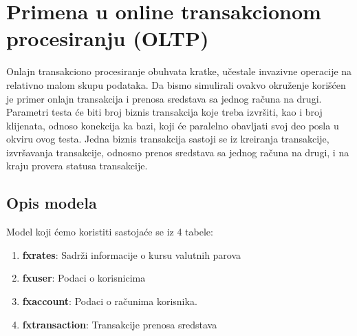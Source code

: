 \documentclass[12pt,oneside]{memoir}
\begin{document}
\pagebreak

\section{Primena u online transakcionom procesiranju (OLTP)}

Onlajn transakciono procesiranje obuhvata kratke, učestale invazivne operacije na relativno malom skupu podataka. Da bismo simulirali ovakvo okruženje korišćen je primer onlajn transakcija i prenosa sredstava sa jednog računa na drugi. Parametri testa će biti broj biznis transakcija koje treba izvršiti, kao i broj klijenata, odnoso konekcija ka bazi, koji će paralelno obavljati svoj deo posla u okviru ovog testa. Jedna biznis transakcija sastoji se iz kreiranja transakcije, izvršavanja transakcije, odnosno prenos sredstava sa jednog računa na drugi, i na kraju provera statusa transakcije. 


\subsection{Opis modela}

Model koji ćemo koristiti sastojaće se iz 4 tabele:

\begin{enumerate}
\item[\textbullet] \textbf{fxrates}: {
	Sadrži informacije o kursu valutnih parova
}
\item[\textbullet] \textbf{fxuser}:{
	Podaci o korisnicima
}
\item[\textbullet] \textbf{fxaccount}:{
	Podaci o računima korisnika.
}
\item[\textbullet] \textbf{fxtransaction}:{
	Transakcije prenosa sredstava
}
\end{enumerate}

\end{document}
